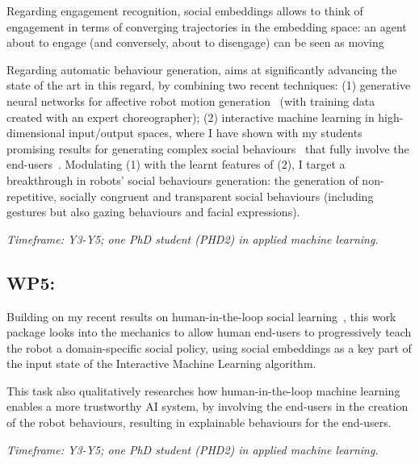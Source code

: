 Regarding engagement recognition, social embeddings allows to think of
engagement in terms of converging trajectories in the embedding space: an agent
about to engage (and conversely, about to disengage) can be seen as moving

Regarding automatic behaviour generation, \project aims at significantly
advancing the state of the art in this regard, by combining two recent
techniques: (1) generative neural networks for affective robot motion
generation~\cite{marmpena2019generating,suguitan2020moveae} (with training data
created with an expert choreographer); (2) interactive machine learning in
high-dimensional input/output spaces, where I have shown with my students
promising results for generating complex social
behaviours~\cite{senft2019teaching, winkle2020couch} that fully involve the
end-users~\cite{winkle2018social}. Modulating (1) with the learnt features of
(2), I target a breakthrough in robots' social behaviours generation: the
generation of non-repetitive, socially congruent and transparent social
behaviours (including gestures but also gazing behaviours and facial
expressions).


\vspace{1em}
\noindent\emph{Timeframe: Y3-Y5; one PhD student (PHD2) in applied machine
    learning.}


\subsection{WP5: \textbf{\wpFive}}

Building on my recent results on human-in-the-loop social
learning~\cite{senft2017supervised, senft2019teaching,
winkle2020couch,winkle2021leador}, this work package looks into the mechanics to
allow human end-users to progressively teach the robot a domain-specific social
policy, using social embeddings as a key part of the input state of the
Interactive Machine Learning algorithm.

This task also qualitatively researches how human-in-the-loop machine
learning enables a more trustworthy AI system, by involving the end-users in the
creation of the robot behaviours, resulting in explainable behaviours for the
end-users.


\vspace{1em}
\noindent\emph{Timeframe: Y3-Y5; one PhD student (PHD2) in applied machine
    learning.}


